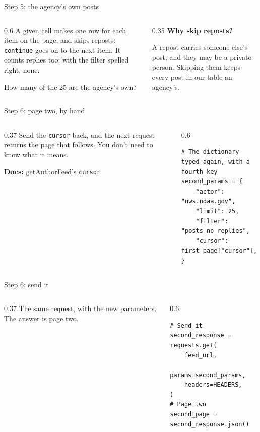 \documentclass[9pt,aspectratio=169]{beamer}
\begin{document}
\begin{frame}{Step 5: the agency's own posts}
    \begin{columns}[T]
        \begin{column}{0.6\textwidth}
            A given cell makes one row for each item on the page, and skips reposts: \texttt{continue} goes on to the next item. It counts replies too: with the filter spelled right, none.

            \medskip
            How many of the 25 are the agency's own?
        \end{column}
        \begin{column}{0.35\textwidth}
            \textbf{Why skip reposts?}\\[2pt]
            {\footnotesize A repost carries someone else's post, and they may be a private person. Skipping them keeps every post in our table an agency's.\par}
        \end{column}
    \end{columns}
\end{frame}

\begin{frame}[fragile]{Step 6: page two, by hand}
    \begin{columns}[T]
        \begin{column}{0.37\textwidth}
            Send the \texttt{cursor} back, and the next request returns the page that follows. You don't need to know what it means.

            \medskip
            {\scriptsize\textbf{Docs:} \href{https://endpoints.bsky.app/\#bluesky-app/tag/appbskyfeed/GET/xrpc/app.bsky.feed.getAuthorFeed}{getAuthorFeed}'s \texttt{cursor}\par}
        \end{column}
        \begin{column}{0.6\textwidth}
\begin{lstlisting}
# The dictionary typed again, with a fourth key
second_params = {
    "actor": "nws.noaa.gov",
    "limit": 25,
    "filter": "posts_no_replies",
    "cursor": first_page["cursor"],
}
\end{lstlisting}
        \end{column}
    \end{columns}
\end{frame}

\begin{frame}[fragile]{Step 6: send it}
    \begin{columns}[T]
        \begin{column}{0.37\textwidth}
            The same request, with the new parameters. The answer is page two.
        \end{column}
        \begin{column}{0.6\textwidth}
\begin{lstlisting}
# Send it
second_response = requests.get(
    feed_url,
    params=second_params,
    headers=HEADERS,
)
# Page two
second_page = second_response.json()
\end{lstlisting}
        \end{column}
    \end{columns}
\end{frame}
\end{document}
